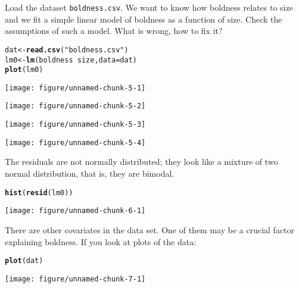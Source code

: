 \documentclass[12pt,a4paper]{scrartcl}\usepackage[]{graphicx}\usepackage[]{color}
\makeatletter
\def\maxwidth{ %
  \ifdim\Gin@nat@width>\linewidth
    \linewidth
  \else
    \Gin@nat@width
  \fi
}
\newcommand{\hlstr}[1]{\textcolor[rgb]{0.192,0.494,0.8}{#1}}%
\newcommand{\hlopt}[1]{\textcolor[rgb]{0,0,0}{#1}}%
\newcommand{\hlstd}[1]{\textcolor[rgb]{0.345,0.345,0.345}{#1}}%
\newcommand{\hlkwb}[1]{\textcolor[rgb]{0.69,0.353,0.396}{#1}}%
\newcommand{\hlkwc}[1]{\textcolor[rgb]{0.333,0.667,0.333}{#1}}%
\newcommand{\hlkwd}[1]{\textcolor[rgb]{0.737,0.353,0.396}{\textbf{#1}}}%
\newenvironment{kframe}{%
 \def\at@end@of@kframe{}%
 \ifinner\ifhmode%
  \def\at@end@of@kframe{\end{minipage}}%
  \begin{minipage}{\columnwidth}%
 \fi\fi%
 \def\FrameCommand##1{\hskip\@totalleftmargin \hskip-\fboxsep
 \colorbox{shadecolor}{##1}\hskip-\fboxsep
     \hskip-\linewidth \hskip-\@totalleftmargin \hskip\columnwidth}%
 \MakeFramed {\advance\hsize-\width
   \@totalleftmargin\z@ \linewidth\hsize
   \@setminipage}}%
 {\par\unskip\endMakeFramed%
 \at@end@of@kframe}
\newenvironment{knitrout}{}{} %
\makeatother
\begin{document}
\begin{Exercise}[difficulty=1, title={What is missing?}]


Load the dataset \texttt{boldness.csv}. We want to know how boldness relates to size and we fit a simple linear model of boldness as a function of size. Check the assumptions of such a model. What is wrong, how to fix it?
\end{Exercise}
\begin{Answer}
\begin{knitrout}
\color{fgcolor}\begin{kframe}
\begin{alltt}
\hlstd{dat} \hlkwb{<-} \hlkwd{read.csv}\hlstd{(}\hlstr{"boldness.csv"}\hlstd{)}
\hlstd{lm0} \hlkwb{<-} \hlkwd{lm}\hlstd{(boldness}\hlopt{~}\hlstd{size,} \hlkwc{data} \hlstd{= dat)}
\hlkwd{plot}\hlstd{(lm0)}
\end{alltt}
\end{kframe}
\texttt{[image: figure/unnamed-chunk-5-1]} 

\texttt{[image: figure/unnamed-chunk-5-2]} 

\texttt{[image: figure/unnamed-chunk-5-3]} 

\texttt{[image: figure/unnamed-chunk-5-4]} 

\end{knitrout}
The residuals are not normally distributed; they look like a mixture of two normal distribution, that is, they are bimodal.
\begin{knitrout}
\color{fgcolor}\begin{kframe}
\begin{alltt}
\hlkwd{hist}\hlstd{(}\hlkwd{resid}\hlstd{(lm0))}
\end{alltt}
\end{kframe}
\texttt{[image: figure/unnamed-chunk-6-1]} 

\end{knitrout}

There are other covariates in the data set. One of them may be a crucial factor explaining boldness. If you look at plots of the data:
\begin{knitrout}
\color{fgcolor}\begin{kframe}
\begin{alltt}
\hlkwd{plot}\hlstd{(dat)}
\end{alltt}
\end{kframe}
\texttt{[image: figure/unnamed-chunk-7-1]} 


\end{knitrout}
\end{Answer}
\end{document}
